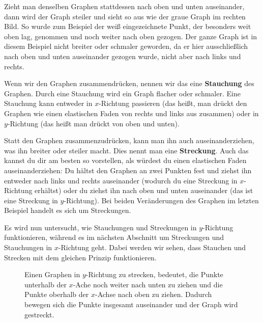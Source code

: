 \documentclass[../../main.tex]{subfiles}
\begin{document}
\begin{example}{}
    Zieht man denselben Graphen stattdessen nach oben und unten auseinander, dann wird der Graph steiler und sieht so aus wie der graue Graph im rechten Bild. So wurde zum Beispiel der weiß eingezeichnete Punkt, der besonders weit oben lag, genommen und noch weiter nach oben gezogen. Der ganze Graph ist in diesem Beispiel nicht breiter oder schmaler geworden, da er hier ausschließlich nach oben und unten auseinander gezogen wurde, nicht aber nach links und rechts.
\end{example}

Wenn wir den Graphen zusammendrücken, nennen wir das eine \textbf{Stauchung} des Graphen. Durch eine Stauchung wird ein Graph flacher oder schmaler. Eine Stauchung kann entweder in $x$-Richtung passieren (das heißt, man drückt den Graphen wie einen elastischen Faden von rechts und links aus zusammen) oder in $y$-Richtung (das heißt man drückt von oben und unten).

Statt den Graphen zusammenzudrücken, kann man ihn auch auseinanderziehen, was ihn breiter oder steiler macht. Dies nennt man eine \textbf{Streckung}. Auch das kannst du dir am besten so vorstellen, als würdest du einen elastischen Faden auseinanderziehen: Du hältst den Graphen an zwei Punkten fest und ziehst ihn entweder nach links und rechts auseinander (wodurch du eine Streckung in $x$-Richtung erhältst) oder du ziehst ihn nach oben und unten auseinander (das ist eine Streckung in $y$-Richtung). Bei beiden Veränderungen des Graphen im letzten Beispiel handelt es sich um Streckungen.

Es wird nun untersucht, wie Stauchungen und Streckungen in $y$-Richtung funktionieren, während es im nächsten Abschnitt um Streckungen und Stauchungen in $x$-Richtung geht. Dabei werden wir sehen, dass Stauchen und Strecken mit dem gleichen Prinzip funktionieren.


\begin{figure}[ht]
    \centering
    \caption{Einen Graphen in $y$-Richtung zu strecken, bedeutet, die Punkte unterhalb der $x$-Ache noch weiter nach unten zu ziehen und die Punkte oberhalb der $x$-Achse nach oben zu ziehen. Dadurch bewegen sich die Punkte insgesamt auseinander und der Graph wird gestreckt.}
\end{figure}
\end{document}
